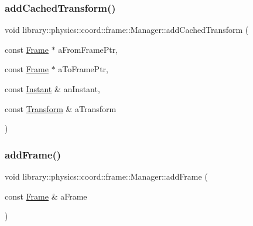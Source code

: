 \subsubsection{\texorpdfstring{add\+Cached\+Transform()}{addCachedTransform()}}
{\footnotesize\ttfamily void library\+::physics\+::coord\+::frame\+::\+Manager\+::add\+Cached\+Transform (\begin{DoxyParamCaption}\item[{const \hyperlink{classlibrary_1_1physics_1_1coord_1_1_frame}{Frame} $\ast$}]{a\+From\+Frame\+Ptr,  }\item[{const \hyperlink{classlibrary_1_1physics_1_1coord_1_1_frame}{Frame} $\ast$}]{a\+To\+Frame\+Ptr,  }\item[{const \hyperlink{classlibrary_1_1physics_1_1time_1_1_instant}{Instant} \&}]{an\+Instant,  }\item[{const \hyperlink{classlibrary_1_1physics_1_1coord_1_1_transform}{Transform} \&}]{a\+Transform }\end{DoxyParamCaption})}

\mbox{\label{classlibrary_1_1physics_1_1coord_1_1frame_1_1_manager_aa4215eb9b956a3b4a2933a33d98b7007}} 
\subsubsection{\texorpdfstring{add\+Frame()}{addFrame()}\hspace{0.1cm}{\footnotesize\ttfamily [1/2]}}
{\footnotesize\ttfamily void library\+::physics\+::coord\+::frame\+::\+Manager\+::add\+Frame (\begin{DoxyParamCaption}\item[{const \hyperlink{classlibrary_1_1physics_1_1coord_1_1_frame}{Frame} \&}]{a\+Frame }\end{DoxyParamCaption})}

\mbox{\label{classlibrary_1_1physics_1_1coord_1_1frame_1_1_manager_a65ef93583a62089cb3192527babddab6}} 
